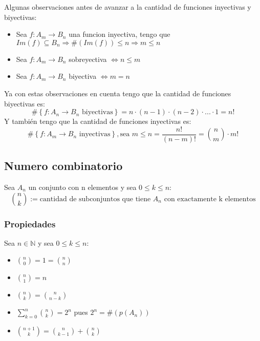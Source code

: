 \documentclass{article}
\newcommand{\card}[1]{\##1}
\begin{document}
Algunas observaciones antes de avanzar a la cantidad de funciones inyectivas y biyectivas: \begin{itemize}
    \item Sea $f: A_m \rightarrow B_n$ una funcion inyectiva, tengo que $Im(f) \subseteq B_n \Rightarrow \card{(Im(f))} \leq n \Rightarrow m \leq n$
    \item Sea $f: A_m \rightarrow B_n$ sobreyectiva $\iff n \leq m$
    \item Sea $f: A_m \rightarrow B_n$ biyectiva $\iff m = n$
\end{itemize}
Ya con estas observaciones en cuenta tengo que la cantidad de funciones biyectivas es: \begin{equation}
    \card{\left\{f: A_n \rightarrow B_n \text{ biyectivas}\right\}} = n \cdot (n-1) \cdot (n-2) \cdot ... \cdot 1 = n!
\end{equation}
Y también tengo que la cantidad de funciones inyectivas es: \begin{equation}
    \card{\left\{f: A_m \rightarrow B_n \text{ inyectivas}\right\}}, \text{sea $m \leq n$} = \frac{n!}{(n-m)!} = \binom{n}{m} \cdot m!
\end{equation}

\subsection{Numero combinatorio}
Sea $A_n$ un conjunto con n elementos y sea $0 \leq k \leq n$: \begin{equation}
    \binom{n}{k}:= \text{cantidad de subconjuntos que tiene $A_n$ con exactamente k elementos}
\end{equation}

\subsubsection{Propiedades}
Sea $n \in \mathbb{N}$ y sea $0 \leq k \leq n$: \begin{itemize}
    \item $\binom{n}{0} = 1 = \binom{n}{n}$
    \item $\binom{n}{1} = n$
    \item $\binom{n}{k} = \binom{n}{n-k}$
    \item $\sum_{k=0}^n \binom{n}{k} = 2^n$ pues $2^n = \card{(p(A_n))}$
    \item $\binom{n+1}{k} = \binom{n}{k-1} + \binom{n}{k}$
\end{itemize}
\end{document}
